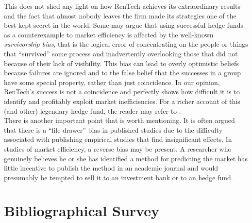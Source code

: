 This does not shed any light on how RenTech achieves its extraordinary results and the fact that almost nobody leaves the firm made its strategies one of the best-kept secret in the world. Some may argue that using successful hedge funds as a counterexample to market efficiency is affected by the well-known \emph{survivorship bias}, that is the logical error of concentrating on the people or things that ``survived'' some process and inadvertently overlooking those that did not because of their lack of visibility. This bias can lead to overly optimistic beliefs because failures are ignored and to the false belief that the successes in a group have some special property, rather than just coincidence. In our opinion, RenTech's success is not a coincidence and perfectly shows how difficult it is to identify and profitably exploit market inefficiencies. For a richer account of this (and other) legendary hedge fund, the reader may refer to \cite{mallaby2010more}.\\
There is another important point that is worth mentioning. It is often argued that there is a ``file drawer'' bias in published studies due to the difficulty associated with publishing empirical studies that find insignificant effects. In studies of market efficiency, a reverse bias may be present. A researcher who genuinely believes he or she has identified a method for predicting the market has little incentive to publish the method in an academic journal and would presumably be tempted to sell it to an investment bank or to an hedge fund.\\

\section{Bibliographical Survey}
\label{sec:bibliographical_survey}

